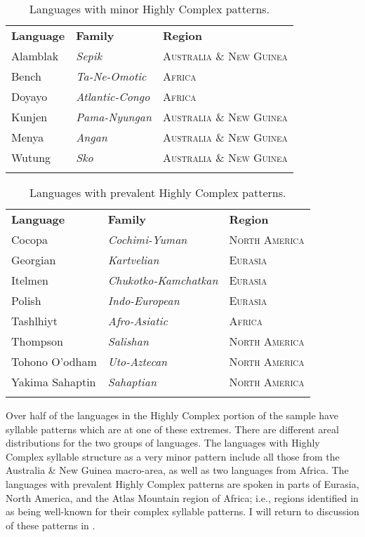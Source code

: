 \begin{table}
\begin{tabularx}{\textwidth}{XXX}
\lsptoprule

\textbf{Language} & \textbf{Family} & \textbf{Region}\\
Alamblak & \textit{Sepik} & \textsc{Australia} \textsc{\&} \textsc{New} \textsc{Guinea}\\
Bench & \textit{Ta-Ne-Omotic} & \textsc{Africa}\\
Doyayo & \textit{Atlantic-Congo} & \textsc{Africa}\\
Kunjen & \textit{Pama-Nyungan} & \textsc{Australia} \textsc{\&} \textsc{New} \textsc{Guinea}\\
Menya & \textit{Angan} & \textsc{Australia} \textsc{\&} \textsc{New} \textsc{Guinea}\\
Wutung & \textit{Sko} & \textsc{Australia} \textsc{\&} \textsc{New} \textsc{Guinea}\\
\lspbottomrule
\end{tabularx}
\caption{\label{tab:3.15}Languages with minor Highly Complex patterns.}
\end{table}




\begin{table}
\begin{tabularx}{\textwidth}{XXX}
\lsptoprule

\textbf{Language} & \textbf{Family} & \textbf{Region}\\
Cocopa & \textit{Cochimi-Yuman} & \textsc{North} \textsc{America}\\
Georgian & \textit{Kartvelian} & \textsc{Eurasia}\\
Itelmen & \textit{Chukotko-Kamchatkan} & \textsc{Eurasia}\\
Polish & \textit{Indo-European} & \textsc{Eurasia}\\
Tashlhiyt & \textit{Afro-Asiatic} & \textsc{Africa}\\
Thompson & \textit{Salishan} & \textsc{North} \textsc{America}\\
Tohono O’odham & \textit{Uto-Aztecan} & \textsc{North} \textsc{America}\\
Yakima Sahaptin & \textit{Sahaptian} & \textsc{North} \textsc{America}\\
\lspbottomrule
\end{tabularx}
\caption{\label{tab:3.16}Languages with prevalent Highly Complex patterns.}
\end{table}

  Over half of the languages in the Highly Complex portion of the sample have syllable patterns which are at one of these extremes. There are different areal distributions for the two groups of languages. The languages with Highly Complex syllable structure as a very minor pattern include all those from the Australia \& New Guinea macro-area, as well as two languages from Africa. The languages with prevalent Highly Complex patterns are spoken in parts of Eurasia, North America, and the Atlas Mountain region of Africa; i.e., regions identified in  as being well-known for their complex syllable patterns. I will return to discussion of these patterns in .

